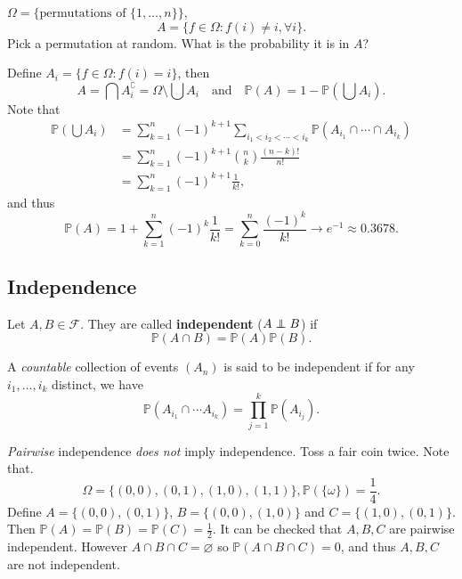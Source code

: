 \begin{example}
    $ \Omega=\{\text{permutations of }\{1,\dots,n\}\} $,
    \[
        A = \{f\in\Omega: f(i)\neq i, \forall i\}.
    \]
    Pick a permutation at random. What is the probability it is in $A$?

    Define $ A_i = \{f\in \Omega: f(i)=i\} $, then 
    \[
        A=\bigcap A_i^{\complement} = \Omega\setminus \bigcup A_i \quad \text{and}\quad \mathbb{P}(A)=1-\mathbb{P}\left( \bigcup A_i \right).
    \]
    Note that 
    \begin{align*}
        \mathbb{P}\left( \bigcup A_i \right)&= \sum_{k=1}^{n}(-1)^{k+1} \sum_{i_1<i_2<\cdots<i_k}\mathbb{P}\left( A_{i_1}\cap \cdots \cap A_{i_k} \right)\\ 
        &= \sum_{k=1}^{n}(-1)^{k+1}\binom{n}{k}\frac{(n-k)!}{n!}\\ 
        &= \sum_{k=1}^{n}(-1)^{k+1}\frac{1}{k!},
    \end{align*}
    and thus 
    \[
        \mathbb{P}(A) = 1+\sum_{k=1}^{n}(-1)^{k}\frac{1}{k!} = \sum_{k=0}^{n}\frac{(-1)^k}{k!}\to e^{-1}\approx 0.3678.
    \]
\end{example}

\subsection{Independence}

\begin{definition}[Independence]
    Let $ A,B\in \mathscr{F} $. They are called \textbf{independent} ($ A \independent B $) if 
    \[
        \mathbb{P}(A \cap B) = \mathbb{P}(A)\mathbb{P}(B).
    \]

    A \textit{countable} collection of events $ (A_n) $ is said to be independent if for any $ i_1,\dots,i_k $ distinct, we have 
    \[
        \mathbb{P}(A_{i_1}\cap \cdots A_{i_k}) = \prod_{j=1}^{k}\mathbb{P}(A_{i_j}).
    \]
\end{definition}
\begin{remark}
    \textit{Pairwise} independence \textit{does not} imply independence. Toss a fair coin twice. Note that.
    \[
        \Omega=\{(0,0),(0,1),(1,0),(1,1)\}, \mathbb{P}(\{\omega\})=\frac{1}{4}.
    \]
    Define $ A=\{(0,0),(0,1)\} $, $ B=\{(0,0),(1,0)\} $ and $ C=\{(1,0),(0,1)\} $. Then $ \mathbb{P}(A)=\mathbb{P}(B)=\mathbb{P}(C)=\frac{1}{2} $. It can be checked that $A,B,C$ are pairwise independent. However $ A \cap B \cap C= \varnothing  $ so $ \mathbb{P}(A \cap B \cap C)=0 $, and thus $A,B,C$ are not independent.
\end{remark}

